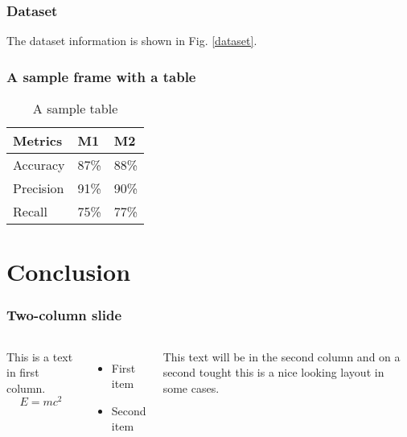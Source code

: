 \documentclass[utf8]{beamer}%
\begin{document}
	\begin{frame}
		\frametitle{Dataset}
		
		The dataset information is shown in Fig. \ref{dataset}.
		
	\end{frame}
	
	\begin{frame}
		\frametitle{A sample frame with a table}
		
		\begin{table}[ht]
			\caption{A sample table}
			\label{T1}
			\centering
			\begin{tabular}{p{1.5cm}|p{1.5cm}|p{1.5cm}}
				\hline
				Metrics   &   M1 &	M2	\\
				\hline
				Accuracy  &  87\% &	88\%	\\
				Precision &  91\% &	90\%	\\
				Recall	  & 75\% &	77\%	\\
				\hline
			\end{tabular}
		\end{table}
		
	\end{frame}
	
	\section{Conclusion}
	
	\begin{frame}
		\frametitle{Two-column slide}
		
		\begin{columns}
			
			
			\column{0.5\textwidth}
			This is a text in first column.
			$$E=mc^2$$
			\begin{itemize}
				\item First item
				\item Second item
			\end{itemize}
			
			\column{0.5\textwidth}
			This text will be in the second column
			and on a second tought this is a nice looking
			layout in some cases.
		\end{columns}
	\end{frame}
	
\end{document}
